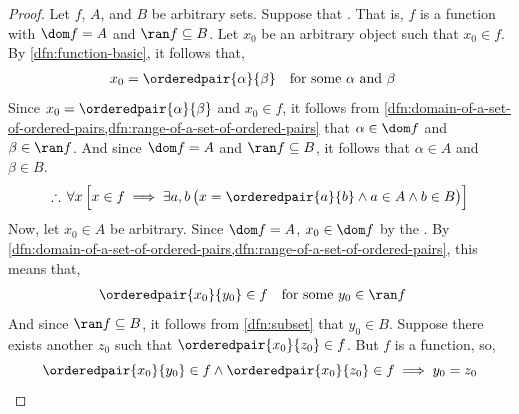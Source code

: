 \begin{proof}
    Let \( f \), \( A \), and \( B \) be arbitrary sets. Suppose that . That is, \( f \) is a function with
    \( \dom f = A \) and \( \ran f \subseteq B \). Let \( x_{0} \) be an arbitrary object such that \( x_{0} \in f \). By
    \cref{dfn:function-basic}, it follows that,
    \begin{equation*}
        \begin{aligned}
            x_{0} = \orderedpair{\alpha}{\beta}&
        \end{aligned}
        \begin{aligned}
            &\text{for some \( \alpha \) and \( \beta \)}
        \end{aligned}
    \end{equation*}
    Since \( x_{0} = \orderedpair{\alpha}{\beta} \) and \( x_{0} \in f \), it follows from \cref{dfn:domain-of-a-set-of-ordered-pairs,dfn:range-of-a-set-of-ordered-pairs}
    that \( \alpha \in \dom f \) and \( \beta \in \ran f \). And since \( \dom f = A \) and \( \ran f \subseteq B\), it follows that \( \alpha \in A \) and \( \beta \in B \).
    \begin{equation}
        \label{eq:first-conjunct}
        \therefore \, \forall x \, \Big[ x \in f \implies \exists a,b \, \big( x = \orderedpair{a}{b} \land a \in A \land b \in B \big) \Big]
    \end{equation}
    Now, let \( x_{0} \in A \) be arbitrary. Since \( \dom f = A \), \( x_{0} \in \dom f \) by the .
    By \cref{dfn:domain-of-a-set-of-ordered-pairs,dfn:range-of-a-set-of-ordered-pairs}, this means that,
    \begin{equation*}
        \begin{aligned}
            \orderedpair{x_{0}}{y_{0}} \in f&
        \end{aligned}
        \begin{aligned}
            &\text{for some \( y_{0} \in \ran f \)}
        \end{aligned}
    \end{equation*}
    And since \( \ran f \subseteq B \), it follows from \cref{dfn:subset} that \( y_{0} \in B \). Suppose there exists another \( z_{0} \) such that
    \( \orderedpair{x_{0}}{z_{0}} \in f \). But \( f \) is a function, so,
    \begin{equation*}
        \orderedpair{x_{0}}{y_{0}} \in f \land \orderedpair{x_{0}}{z_{0}} \in f \implies y_{0} = z_{0}
    \end{equation*}

\end{proof}

